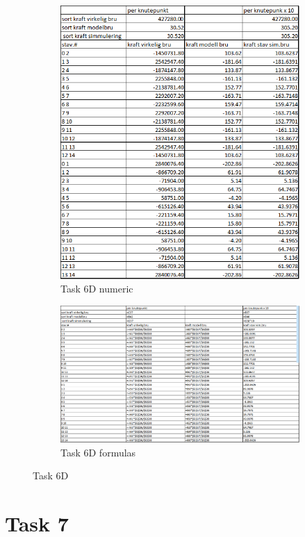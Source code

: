 \documentclass{report}
\begin{document}
\begin{figure}[H]
	\centering
	\begin{subfigure}{.8\linewidth}
		\centering
		\includegraphics [width=.8\linewidth]{task-6D}

		\caption{Task 6D numeric}
		\label{fig:6d:num}
	\end{subfigure}
	\begin{subfigure}{.8\linewidth}
		\centering
		\includegraphics [width=.8\linewidth]{task-6D-formulas}

		\caption{Task 6D formulas}
		\label{fig:6d:form}
	\end{subfigure}
	\caption{Task 6D}
	\label{fig:6d}
\end{figure}

\section{Task 7}
\end{document}
